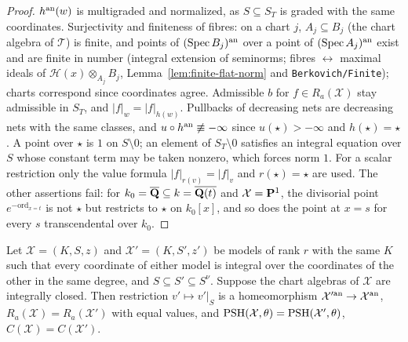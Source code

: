 \begin{proof}
$h^{\mathrm{an}}(w)$ is multigraded and normalized, as $S\subseteq S_T$ is graded with the same coordinates. Surjectivity and finiteness of fibres: on a chart
$j$, $A_j\subseteq B_j$ (the chart algebra of $\mathcal T$) is finite, and points of $(\operatorname{Spec} B_j)^{\mathrm{an}}$ over a point of $(\operatorname{Spec} A_j)^{\mathrm{an}}$ exist and are finite
in number (integral extension of seminorms; fibres $\leftrightarrow$ maximal ideals of $\mathcal H(x)\otimes_{A_j}B_j$, Lemma~\ref{lem:finite-flat-norm}
and \texttt{Berkovich/Finite}); charts correspond since coordinates agree. Admissible $b$ for $f\in R_a(\mathcal X)$ stay admissible in $S_T$, and
$|f|_w=|f|_{h(w)}$. Pullbacks of decreasing nets are decreasing nets with the same classes, and $u\circ h^{\mathrm{an}}\not\equiv-\infty$ since
$u(\star)>-\infty$ and $h(\star)=\star$. A point over $\star$ is $1$ on $S\setminus0$; an element of $S_T\setminus0$ satisfies an integral equation over $S$
whose constant term may be taken nonzero, which forces norm $1$. For a scalar restriction only the value formula
$|f|_{r(v)}=|f|_v$ and $r(\star)=\star$ are used. The other assertions fail: for $k_0=\overline{\mathbf{Q}}\subseteq k=\overline{\mathbf{Q}(t)}$ and
$\mathcal X=\mathbf{P}^1$, the divisorial point $e^{-\mathrm{ord}_{x=t}}$ is not $\star$ but restricts to $\star$ on $k_0[x]$, and so does the
point at $x=s$ for every $s$ transcendental over $k_0$.
\end{proof}

\begin{lemma}\label{lem:gl-model-change}
\leanok
{}
Let $\mathcal X=(K,S,z)$ and $\mathcal X'=(K,S',z')$ be models of rank $r$ with the same $K$ such that every coordinate of either model is
integral over the coordinates of the other in the same degree, and $S\subseteq S'\subseteq S^\nu$. Suppose the chart algebras of $\mathcal X$ are
integrally closed. Then restriction $v'\mapsto v'|_S$ is a homeomorphism $\mathcal X'^{\mathrm{an}}\to\mathcal X^{\mathrm{an}}$, $R_a(\mathcal X)=R_a(\mathcal X')$ with
equal values, and $\operatorname{PSH}(\mathcal X,\theta)=\operatorname{PSH}(\mathcal X',\theta)$, $C(\mathcal X)=C(\mathcal X')$.
\end{lemma}

